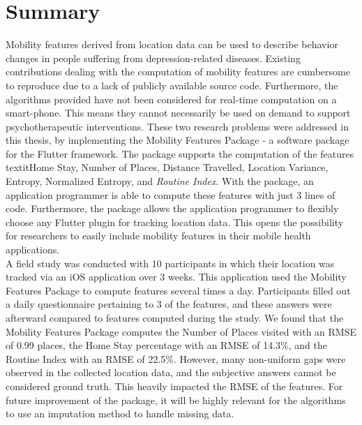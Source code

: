\chapter{Summary}
Mobility features derived from location data can be used to describe behavior changes in people suffering from depression-related diseases. Existing contributions dealing with the computation of mobility features are cumbersome to reproduce due to a lack of publicly available source code. Furthermore, the algorithms provided have not been considered for real-time computation on a smart-phone. This means they cannot necessarily be used on demand to support psychotherapeutic interventions. These two research problems were addressed in this thesis, by implementing the Mobility Features Package - a software package for the Flutter framework. The package supports the computation of the features textit{Home Stay, Number of Places, Distance Travelled, Location Variance, Entropy, Normalized Entropy,} and \textit{Routine Index}. With the package, an application programmer is able to compute these features with just 3 lines of code. Furthermore, the package allows the application programmer to flexibly choose any Flutter plugin for tracking location data. This opens the possibility for researchers to easily include mobility features in their mobile health applications.\\

A field study was conducted with 10 participants in which their location was tracked via an iOS application over 3 weeks. This application used the Mobility Features Package to compute features several times a day. Participants filled out a daily questionnaire pertaining to 3 of the features, and these answers were afterward compared to features computed during the study. We found that the Mobility Features Package computes the Number of Places visited with an RMSE of 0.99 places, the Home Stay percentage with an RMSE of 14.3\%, and the Routine Index with an RMSE of 22.5\%. However, many non-uniform gaps were observed in the collected location data, and the subjective answers cannot be considered ground truth. This heavily impacted the RMSE of the features. For future improvement of the package, it will be highly relevant for the algorithms to use an imputation method to handle missing data.
